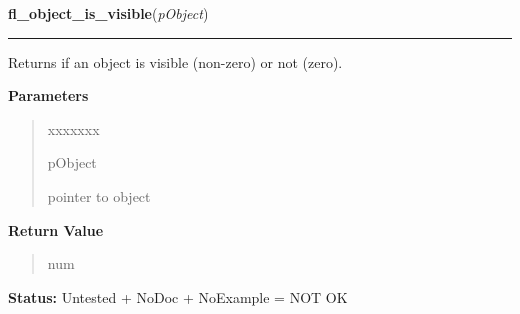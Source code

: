     \label{xformslib:library:fl_object_is_visible}

    \vspace{0.5ex}

\hspace{.8\funcindent}\begin{boxedminipage}{\funcwidth}

    \raggedright \textbf{fl\_object\_is\_visible}(\textit{pObject})

    \vspace{-1.5ex}

    \rule{\textwidth}{0.5\fboxrule}
\setlength{\parskip}{2ex}
    Returns if an object is visible (non-zero) or not (zero).

\setlength{\parskip}{1ex}
      \textbf{Parameters}
      \vspace{-1ex}

      \begin{quote}
        \begin{Ventry}{xxxxxxx}

          \item[pObject]

          pointer to object

        \end{Ventry}

      \end{quote}

      \textbf{Return Value}
    \vspace{-1ex}

      \begin{quote}
      num

      \end{quote}

\textbf{Status:} Untested + NoDoc + NoExample = NOT OK



    \end{boxedminipage}

    \label{xformslib:library:fl_free_object}

    \vspace{0.5ex}

